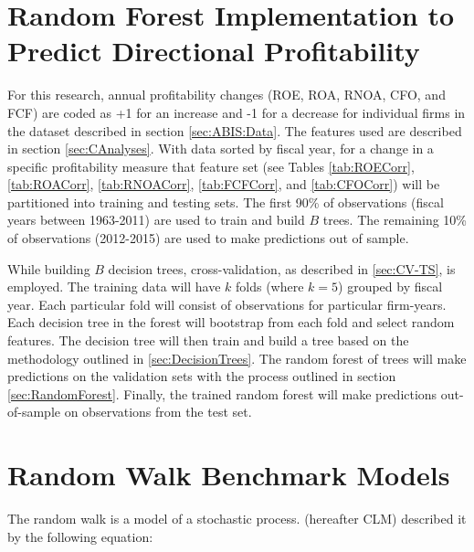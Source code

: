 
\section{Random Forest Implementation to Predict Directional Profitability}

For this research, annual profitability changes (ROE, ROA, RNOA, CFO, and FCF) are coded as +1 for an increase and -1 for a decrease for individual firms in the dataset described in section \ref{sec:ABIS:Data}. The features used are described in section \ref{sec:CAnalyses}. With data sorted by fiscal year, for a change in a specific profitability measure that feature set (see Tables \ref{tab:ROECorr},  \ref{tab:ROACorr},  \ref{tab:RNOACorr},  \ref{tab:FCFCorr}, and \ref{tab:CFOCorr}) will be partitioned into training and testing sets. The first 90\% of observations (fiscal years between 1963-2011) are used to train and build \(B\) trees.  The remaining 10\% of observations (2012-2015) are used to make predictions out of sample. 

While building \(B\) decision trees,  cross-validation, as described in \ref{sec:CV-TS}, is employed. The training data will have \(k\) folds (where \(k=5\)) grouped by fiscal year.  Each particular fold will consist of observations for particular firm-years.  Each decision tree in the forest will bootstrap from each fold and select random features. The decision tree will then train and build a tree based on the methodology outlined in \ref{sec:DecisionTrees}. The random forest of trees will make predictions on the validation sets with the process outlined in section \ref{sec:RandomForest}. Finally, the trained random forest will  make predictions out-of-sample on observations from the test set.

\section{Random Walk Benchmark Models} \label{sec:RWModel}

The random walk is a model of a stochastic process.  \cite{Campbell1997} (hereafter CLM)  described it by the following equation: 

